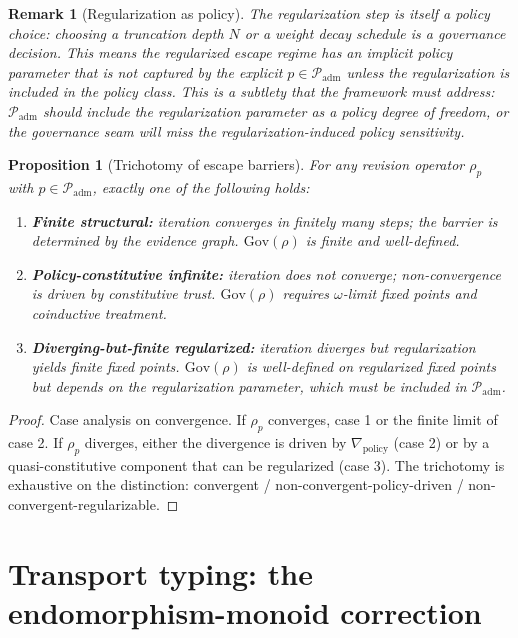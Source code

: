 \documentclass[11pt]{article}
\newtheorem{proposition}{Proposition}
\newtheorem{remark}{Remark}
\newcommand{\Gov}{\mathrm{Gov}}
\newcommand{\Padm}{\mathcal{P}_{\mathrm{adm}}}
\begin{document}
\begin{remark}[Regularization as policy]
The regularization step is itself a policy choice: choosing a truncation depth $N$ or a weight
decay schedule is a governance decision. This means the regularized escape regime has an
implicit policy parameter that is not captured by the explicit $p \in \Padm$ unless the
regularization is included in the policy class. This is a subtlety that the framework must
address: $\Padm$ should include the regularization parameter as a policy degree of freedom,
or the governance seam will miss the regularization-induced policy sensitivity.
\end{remark}

\begin{proposition}[Trichotomy of escape barriers]
\label{prop:escape-trichotomy}
For any revision operator $\rho_p$ with $p \in \Padm$, exactly one of the following holds:
\begin{enumerate}
  \item \textbf{Finite structural:} iteration converges in finitely many steps; the barrier is
        determined by the evidence graph. $\Gov(\rho)$ is finite and well-defined.
  \item \textbf{Policy-constitutive infinite:} iteration does not converge; non-convergence is
        driven by constitutive trust. $\Gov(\rho)$ requires $\omega$-limit fixed points and
        coinductive treatment.
  \item \textbf{Diverging-but-finite regularized:} iteration diverges but regularization yields
        finite fixed points. $\Gov(\rho)$ is well-defined on regularized fixed points but
        depends on the regularization parameter, which must be included in $\Padm$.
\end{enumerate}
\end{proposition}

\begin{proof}
Case analysis on convergence. If $\rho_p$ converges, case 1 or the finite limit of case 2.
If $\rho_p$ diverges, either the divergence is driven by $\nabla_{\mathrm{policy}}$ (case 2) or
by a quasi-constitutive component that can be regularized (case 3). The trichotomy is exhaustive
on the distinction: convergent / non-convergent-policy-driven / non-convergent-regularizable.
\end{proof}

\section{Transport typing: the endomorphism-monoid correction}
\label{sec:transport-typing}
\end{document}
